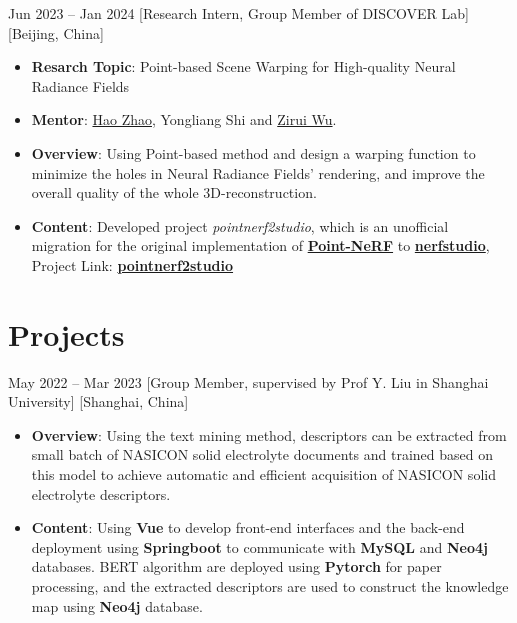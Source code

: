 \documentclass{chicv}
\begin{document}
  {Jun 2023 -- Jan 2024}
  [Research Intern, Group Member of DISCOVER Lab]
  [Beijing, China]
  \begin{itemize}
    \item \textbf{Resarch Topic}: Point-based Scene Warping for High-quality Neural Radiance Fields
    \item \textbf{Mentor}: \href{https://sites.google.com/view/fromandto}{Hao Zhao}, Yongliang Shi and \href{https://wuzirui.github.io/}{Zirui Wu}.
    \item \textbf{Overview}: Using Point-based method and design a warping function to minimize the holes in Neural Radiance Fields' rendering, and improve the overall quality of the whole 3D-reconstruction.
    \item \textbf{Content}: Developed project \textit{pointnerf2studio}, which is an unofficial migration for the original implementation of \href{https://github.com/Xharlie/pointnerf/}{\textbf{Point-NeRF}} to \href{https://github.com/nerfstudio-project/nerfstudio/}{\textbf{nerfstudio}}, Project Link: \href{https://github.com/SHUzhekiNg/pointnerf2studio}{\textbf{pointnerf2studio}}
  \end{itemize}
\section{Projects}



  {May 2022 -- Mar 2023}
  [Group Member, supervised by Prof Y. Liu in Shanghai University]
  [Shanghai, China]
  \begin{itemize}
    \item \textbf{Overview}: Using the text mining method, descriptors can be extracted from small batch of NASICON solid electrolyte documents and trained based on this model to achieve automatic and efficient acquisition of NASICON solid electrolyte descriptors.
    \item \textbf{Content}: Using \textbf{Vue} to develop front-end interfaces and the back-end deployment using \textbf{Springboot} to communicate with \textbf{MySQL} and \textbf{Neo4j} databases. BERT algorithm are deployed using \textbf{Pytorch} for paper processing, and the extracted descriptors are used to construct the knowledge map using \textbf{Neo4j} database.
  \end{itemize}
\end{document}
